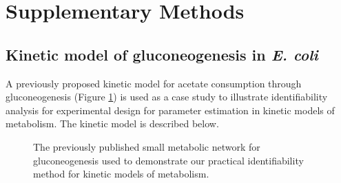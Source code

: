 \documentclass[10pt]{article}
\begin{document}
\clearpage

\section{Supplementary Methods}
\subsection{Kinetic model of gluconeogenesis in \textit{E. coli}}\label{sec:small-model}
A previously proposed kinetic model \parencite{Kotte2014, Srinivasan2017} for acetate consumption through gluconeogenesis (Figure \ref{fig:network}) is used as a case study to illustrate identifiability analysis for experimental design for parameter estimation in kinetic models of metabolism. The kinetic model is described below.

\begin{figure}[!tbhp]
	\caption{The previously published small metabolic network for gluconeogenesis used to demonstrate our practical identifiability method for kinetic models of metabolism.}\label{fig:network}
\end{figure}		
\end{document}
